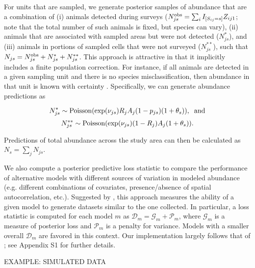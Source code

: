 \documentclass[12pt,fleqn]{article}
\begin{document}
\begin{flushleft}
\hspace{.5in}For units that are sampled, we generate posterior samples of abundance that are a combination of (i) animals detected during surveys ($N_{js}^{\rm obs}=\sum_i I_{[S_{ij}=s]}Z_{ij1}$; note that the total number of such animals is fixed, but species can vary), (ii) animals that are associated with sampled areas but were not detected ($N_{js}^*$), and (iii) animals in portions of sampled cells that were not surveyed ($N_{js}^{**}$), such that $N_{js} = N_{js}^{\rm obs}+N_{js}^*+N_{js}^{**}$.  This approach is attractive in that it implicitly includes a finite population correction.  For instance, if all animals are detected in a given sampling unit and there
is no species misclassification, then abundance in that unit is known with certainty \citep{VerHoef2008,JohnsonEtAl2010}.  Specifically, we can generate abundance predictions as
\begin{linenomath*}
\begin{equation*}
  N_{js}^{*} \sim {\rm Poisson} (\exp(\nu_{js}) R_j A_j (1-p_{js}) (1 + \theta_s)), \hspace{2mm} {\rm and}
\end{equation*}
\begin{equation*}
  N_{js}^{**} \sim {\rm Poisson} (\exp(\nu_{js}) (1-R_j) A_j (1 + \theta_s)).
\end{equation*}
\end{linenomath*}
Predictions of total abundance across the study area can then be calculated as $N_s = \sum_j N_{js}$.

\hspace{.5in}We also compute a posterior predictive loss statistic to compare the performance of alternative models with different sources of variation in modeled abundance (e.g. different combinations of covariates,
presence/absence of spatial autocorrelation, etc.).  Suggested by \citet{GelfandGhosh1998}, this approach measures the ability of a given model to generate datasets similar to the one collected.  In particular, a loss statistic is computed for each model $m$ as $\mathcal{D}_m = \mathcal{G}_m + \mathcal{P}_m$,
where $\mathcal{G}_m$ is a measure of posterior loss and $\mathcal{P}_m$ is a penalty for variance.  Models with a smaller overall $\mathcal{D}_m$ are favored in this context.  Our implementation largely follows that of \citet{ConnEtAl2013}; see Appendix S1 for further details.

\vspace{.15in}
EXAMPLE: SIMULATED DATA \\
\vspace{.15in}


\end{flushleft}
\end{document}

